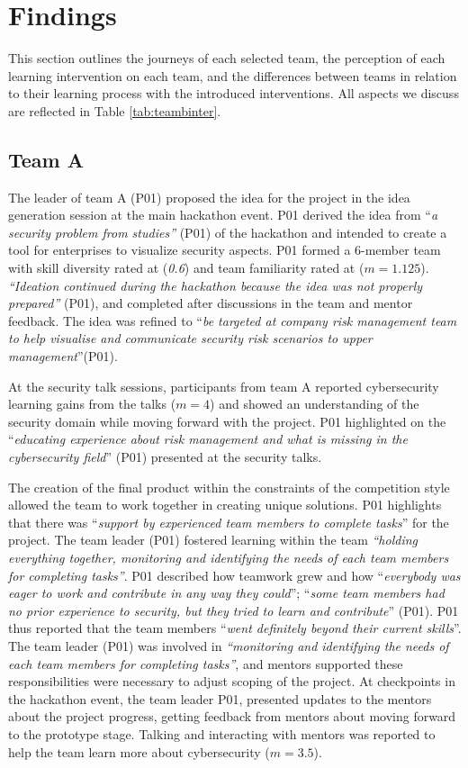 \documentclass[runningheads]{llncs}
\begin{document}
\section{Findings}
This section outlines the journeys of each selected team, the perception of each learning intervention on each team, and the differences between teams in relation to their learning process with the introduced interventions. All aspects we discuss are reflected in Table \ref{tab:teambinter}.

\subsection{Team A}
The leader of team A (P01) proposed the idea for the project in the idea generation session at the main hackathon event. P01 derived the idea from ``\textit{a security problem from studies''} (P01) of the hackathon and intended to create a tool for enterprises to visualize security aspects. P01 formed a 6-member team with skill diversity rated at (\textit{0.6}) and team familiarity rated at ($m = 1.125$). \textit{``Ideation continued during the hackathon because the idea was not properly prepared''} (P01), and completed after discussions in the team and mentor feedback. The idea was refined to ``\textit{be targeted at company risk management team to help visualise and communicate security risk scenarios to upper management}''(P01).

At the security talk sessions, participants from team A reported cybersecurity learning gains from the talks ($m = 4$) and showed an understanding of the security domain while moving forward with the project. P01 highlighted on the ``\textit{educating experience about risk management and what is missing in the cybersecurity field}'' (P01) presented at the security talks.

The creation of the final product within the constraints of the competition style allowed the team to work together in creating unique solutions. P01 highlights that there was ``\textit{support by experienced team members to complete tasks}'' for the project. The team leader (P01) fostered learning within the team \textit{``holding everything together, monitoring and identifying the needs of each team members for completing tasks''}. P01 described how teamwork grew and how ``\textit{everybody was eager to work and contribute in any way they could}''; ``\textit{some team members had no prior experience to security, but they tried to learn and contribute}'' (P01). P01 thus reported that the team members ``\textit{went definitely beyond their current skills}''. The team leader (P01) was involved in  \textit{``monitoring and identifying the needs of each team members for completing tasks''}, and mentors supported these responsibilities were necessary to adjust scoping of the project. At checkpoints in the hackathon event, the team leader P01, presented updates to the mentors about the project progress, getting feedback from mentors about moving forward to the prototype stage. Talking and interacting with mentors was reported to help the team learn more about cybersecurity ($m = 3.5$).
\end{document}

